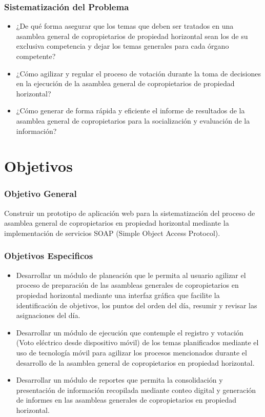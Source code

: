 \subsubsection{Sistematización del Problema}

\begin{itemize}
\item ¿De qué forma asegurar que los temas que deben ser tratados en una asamblea general de copropietarios de propiedad horizontal sean los de su exclusiva competencia y dejar los temas generales para cada órgano competente?

\item ¿Cómo agilizar y regular el proceso de votación durante la toma de decisiones en la ejecución de la asamblea general de copropietarios de propiedad horizontal?

\item ¿Cómo generar de forma rápida y eficiente el informe de resultados de la asamblea general de copropietarios para la socialización y evaluación de la información?
\end{itemize}


\section{Objetivos}
\subsubsection{Objetivo General}

Construir un prototipo de aplicación web para la sistematización del proceso de asamblea general de copropietarios en propiedad horizontal mediante la implementación de servicios SOAP (Simple Object Access Protocol).

\subsubsection{Objetivos Especificos}

\begin{itemize}
  \item Desarrollar un módulo de planeación que le permita al usuario agilizar el proceso de preparación de las asambleas generales de copropietarios en propiedad horizontal mediante una interfaz gráfica que facilite la identificación de objetivos, los puntos del orden del día, resumir y revisar las asignaciones del día.

  \item Desarrollar un módulo de ejecución que contemple el registro y votación (Voto eléctrico desde dispositivo móvil) de los temas planificados mediante el uso de tecnología móvil para agilizar los procesos mencionados durante el desarrollo de la asamblea general de copropietarios en propiedad horizontal.

  \item Desarrollar un módulo de reportes que permita la consolidación y presentación de información recopilada mediante conteo digital y generación de informes en las asambleas generales de copropietarios en propiedad horizontal.

\end{itemize}

